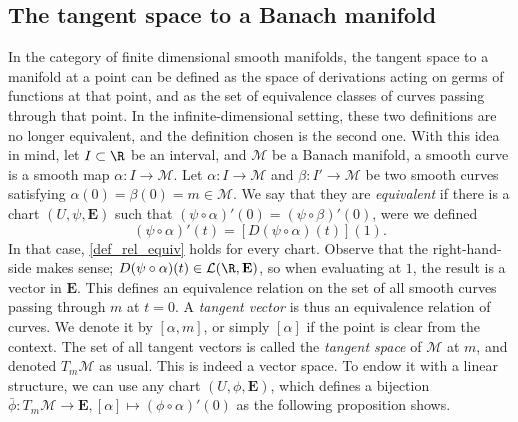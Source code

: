 \subsection{The tangent space to a Banach manifold} \label{section_tangent_space_Banach}
In the category of finite dimensional smooth manifolds, the tangent space to a manifold at a point can be defined as the space of derivations acting on germs of functions at that point, and as the set of equivalence classes of curves passing through that point. In the infinite-dimensional setting, these two definitions are no longer equivalent, and the definition chosen is the second one. With this idea in mind, let \(I \subset \R\) be an interval, and \(\mathcal{M}\) be a Banach manifold, a smooth curve is a smooth map \(\alpha \colon I \to \mathcal{M}\). Let \(\alpha\colon I \to \mathcal{M}\) and \(\beta \colon I' \to \mathcal{M}\) be two smooth curves satisfying \(\alpha(0)=\beta(0)=m \in \mathcal{M}\). We say that they are \textit{equivalent} if there is a chart \((U, \psi, \mathbf{E})\) such that \((\psi \circ \alpha)'(0)=(\psi \circ \beta)'(0)\), were we defined
\begin{equation} \label{def_rel_equiv}
(\psi \circ \alpha)'(t)=[D(\psi \circ \alpha)(t)](1).
\end{equation}
In that case, \eqref{def_rel_equiv} holds for every chart. Observe that the right-hand-side makes sense; \(D(\psi \circ \alpha)(t) \in \mathcal{L}(\R, \mathbf{E})\), so when evaluating at \(1\), the result is a vector in \(\mathbf{E}\). This defines an equivalence relation on the set of all smooth curves passing through \(m\) at $t=0$. A \textit{tangent vector} is thus an equivalence relation of curves. We denote it by \([\alpha, m]\), or simply \([\alpha]\) if the point is clear from the context. The set of all tangent vectors is called the \textit{tangent space} of \(\mathcal{M}\) at \(m\), and denoted \(T_m\mathcal{M}\) as usual. This is indeed a vector space. To endow it with a linear structure, we can use any chart \((U, \phi, \mathbf{E})\), which defines a bijection \(\bar \phi\colon  T_m\mathcal{M} \to \mathbf{E}, [\alpha] \mapsto (\phi \circ \alpha)'(0)\) as the following proposition shows.

